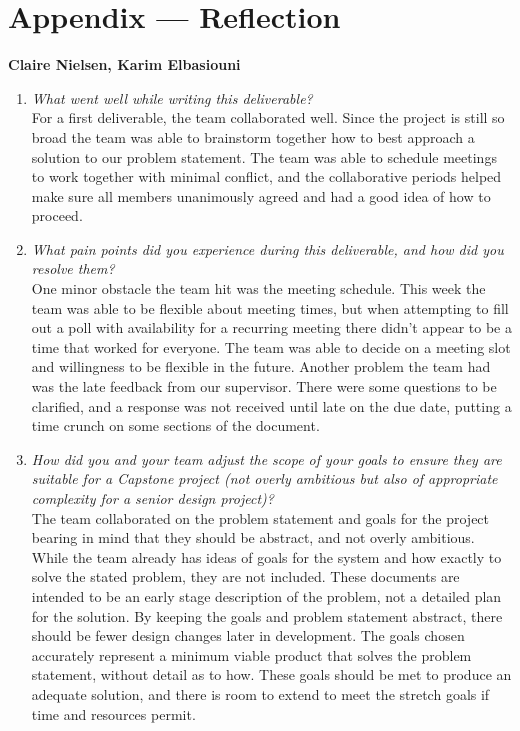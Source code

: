 \documentclass{article}
\begin{document}
\newpage{}

\section*{Appendix --- Reflection}

\textbf{Claire Nielsen, Karim Elbasiouni}
\begin{enumerate}
    \item \textit{What went well while writing this deliverable?}\\
    For a first deliverable, the team collaborated well. Since the project is still so broad the team was able to brainstorm together how to best approach a solution to our problem statement. The team was able to schedule meetings to work together with minimal conflict, and the collaborative periods helped make sure all members unanimously agreed and had a good idea of how to proceed. 
    \item \textit{What pain points did you experience during this deliverable, and how did you resolve them?}\\
    One minor obstacle the team hit was the meeting schedule. This week the team was able to be flexible about meeting times, but when attempting to fill out a poll with availability for a recurring meeting there didn’t appear to be a time that worked for everyone. The team was able to decide on a meeting slot and willingness to be flexible in the future. Another problem the team had was the late feedback from our supervisor. There were some questions to be clarified, and a response was not received until late on the due date, putting a time crunch on some sections of the document. 
    \item \textit{How did you and your team adjust the scope of your goals to ensure they are suitable for a Capstone project (not overly ambitious but also of appropriate complexity for a senior design project)?}\\
    The team collaborated on the problem statement and goals for the project bearing in mind that they should be abstract, and not overly ambitious. While the team already has ideas of goals for the system and how exactly to solve the stated problem, they are not included. These documents are intended to be an early stage description of the problem, not a detailed plan for the solution. By keeping the goals and problem statement abstract, there should be fewer design changes later in development. The goals chosen accurately represent a minimum viable product that solves the problem statement, without detail as to how. These goals should be met to produce an adequate solution, and there is room to extend to meet the stretch goals if time and resources permit.
\end{enumerate}
\end{document}

